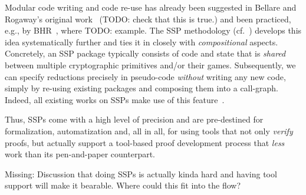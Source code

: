 Modular code writing and code re-use has already been suggested in Bellare and Rogaway's original work~\cite{X} (TODO: check that this is true.) and been practiced, e.g., by BHR~\cite{X}, where TODO: example.
The SSP methodology (cf.~\cite{X,Y,Z}) develops this idea systematically further and ties it in closely with \emph{compositional} aspects. Concretely, an SSP package typically consists of code and state that is \emph{shared} between multiple cryptographic primitives and/or their games. Subsequently, we can specify reductions precisely in pseudo-code \emph{without} writing any new code, simply by re-using existing packages and composing them into a call-graph. Indeed, all existing works on SSPs make use of this feature~\cite{blankedcite}.





Thus, SSPs come with a high level of precision and
are pre-destined for formalization, automatization and,
all in all, for using tools that not only \emph{verify}
proofs, but actually support a tool-based proof development process
that \emph{less} work than its pen-and-paper counterpart.

Missing: Discussion that doing SSPs is actually kinda hard
and having tool support will make it bearable. Where could this
fit into the flow?





